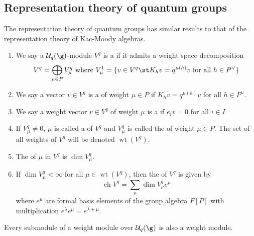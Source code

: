\documentclass[11pt,leqno,oneside]{amsart}
\numberwithin{thm}{section}
\newcommand{\weightlattice}{P}
\newcommand{\U}{\mathcal{U}}
\newcommand{\ch}{\operatorname{ch}}
\DeclareMathOperator{\wt}{wt}
\begin{document}
\subsection{Representation theory of quantum groups}
The representation theory of quantum groups has similar results to
that of the representation theory of Kac-Moody algebras.
\begin{defn}
  \begin{enumerate}
  \item   We say a \(\U_q(\g)\)-module \(V^q\) is a  if it
  admits a weight space decomposition \[
    V^q = \bigoplus_{\mu \in \weightlattice} V_\mu^q \text{ where }
    V_\mu^1 = \{v \in V^q \st K_h v = q^{\mu(h)} v \text{ for all }h
    \in \weightlattice^\vee\}
  \]
  \item We say a vector \(v \in V^q\) is a 
    of weight \(\mu \in \weightlattice\) if \(K_h v = q^{\mu(h)} v\)
    for all \(h \in \weightlattice^\vee\).
  \item We say a weight vector \(v \in V^q\) of weight \(\mu\) is a
     if \(e_i v = 0\) for
    all \(i \in I\).
  \item If \(V_\mu^q \neq 0\), \(\mu\) is called a  of
    \(V^q\) and \(V_\mu^q\) is called the  of weight
    \(\mu \in \weightlattice\). The set of all weights of \(V^q\) will
    be denoted \(\wt(V^q)\).
  \item The  of \(\mu\) in \(V^q\) is \(\dim
    V_\mu^q\).
  \item If \(\dim V^q_\mu < \infty\) for all \(\mu \in \wt(V^q)\),
    then the  of \(V^q\) is given by \[
      \ch V^q = \sum_\mu \dim V^q_\mu e^\mu
    \]
    where \(e^\mu\) are formal basis elements of the group algebra
    \(F[\weightlattice]\) with multiplication \(e^\lambda e^\mu =
    e^{\lambda + \mu}\).
  \end{enumerate}
\end{defn}
\begin{prop}
  Every submodule of a weight module over \(\U_q(\g)\) is also a
  weight module.
\end{prop}
\end{document}
